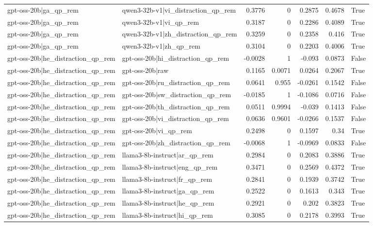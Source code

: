 \begin{table}
\begin{tabular}{l l r r r r l}
gpt-oss-20b|ga_qp_rem & qwen3-32b-v1|vi_distraction_qp_rem & 0.3776 & 0 & 0.2875 & 0.4678 & True \\
gpt-oss-20b|ga_qp_rem & qwen3-32b-v1|vi_qp_rem & 0.3187 & 0 & 0.2286 & 0.4089 & True \\
gpt-oss-20b|ga_qp_rem & qwen3-32b-v1|zh_distraction_qp_rem & 0.3259 & 0 & 0.2358 & 0.416 & True \\
gpt-oss-20b|ga_qp_rem & qwen3-32b-v1|zh_qp_rem & 0.3104 & 0 & 0.2203 & 0.4006 & True \\
gpt-oss-20b|he_distraction_qp_rem & gpt-oss-20b|hi_distraction_qp_rem & -0.0028 & 1 & -0.093 & 0.0873 & False \\
gpt-oss-20b|he_distraction_qp_rem & gpt-oss-20b|raw & 0.1165 & 0.0071 & 0.0264 & 0.2067 & True \\
gpt-oss-20b|he_distraction_qp_rem & gpt-oss-20b|ru_distraction_qp_rem & 0.0641 & 0.955 & -0.0261 & 0.1542 & False \\
gpt-oss-20b|he_distraction_qp_rem & gpt-oss-20b|sw_distraction_qp_rem & -0.0185 & 1 & -0.1086 & 0.0716 & False \\
gpt-oss-20b|he_distraction_qp_rem & gpt-oss-20b|th_distraction_qp_rem & 0.0511 & 0.9994 & -0.039 & 0.1413 & False \\
gpt-oss-20b|he_distraction_qp_rem & gpt-oss-20b|vi_distraction_qp_rem & 0.0636 & 0.9601 & -0.0266 & 0.1537 & False \\
gpt-oss-20b|he_distraction_qp_rem & gpt-oss-20b|vi_qp_rem & 0.2498 & 0 & 0.1597 & 0.34 & True \\
gpt-oss-20b|he_distraction_qp_rem & gpt-oss-20b|zh_distraction_qp_rem & -0.0068 & 1 & -0.0969 & 0.0833 & False \\
gpt-oss-20b|he_distraction_qp_rem & llama3-8b-instruct|ar_qp_rem & 0.2984 & 0 & 0.2083 & 0.3886 & True \\
gpt-oss-20b|he_distraction_qp_rem & llama3-8b-instruct|eng_qp_rem & 0.3471 & 0 & 0.2569 & 0.4372 & True \\
gpt-oss-20b|he_distraction_qp_rem & llama3-8b-instruct|fr_qp_rem & 0.2841 & 0 & 0.1939 & 0.3742 & True \\
gpt-oss-20b|he_distraction_qp_rem & llama3-8b-instruct|ga_qp_rem & 0.2522 & 0 & 0.1613 & 0.343 & True \\
gpt-oss-20b|he_distraction_qp_rem & llama3-8b-instruct|he_qp_rem & 0.2921 & 0 & 0.202 & 0.3823 & True \\
gpt-oss-20b|he_distraction_qp_rem & llama3-8b-instruct|hi_qp_rem & 0.3085 & 0 & 0.2178 & 0.3993 & True \\

\end{tabular}
\end{table}
